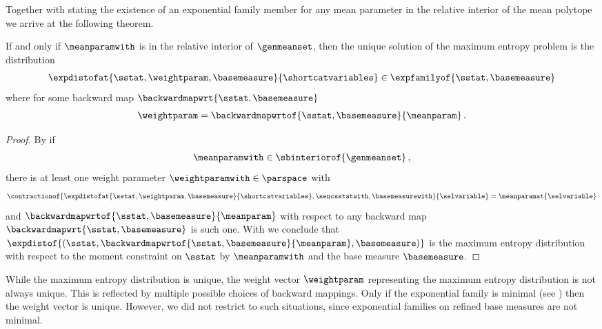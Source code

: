 Together with  stating the existence of an exponential family member for any mean parameter in the relative interior of the mean polytope we arrive at the following theorem.

\begin{theorem}
    \label{the:maxEntropyInterior}
    If and only if $\meanparamwith$ is in the relative interior of $\genmeanset$, then the unique solution of the maximum entropy problem is the distribution
    \begin{align*}
        \expdistofat{\sstat,\weightparam,\basemeasure}{\shortcatvariables}\in\expfamilyof{\sstat,\basemeasure}
    \end{align*}
    where for some backward map $\backwardmapwrt{\sstat,\basemeasure}$
    \begin{align*}
        \weightparam
        = \backwardmapwrtof{\sstat,\basemeasure}{\meanparam} \, .
    \end{align*}
\end{theorem}
\begin{proof}
    By  if
    \begin{align*}
        \meanparamwith \in \sbinteriorof{\genmeanset}  \, ,
    \end{align*}
    there is at least one weight parameter $\weightparamwith\in\parspace$ with
    \begin{align*}
        \contractionof{\expdistofat{\sstat,\weightparam,\basemeasure}{\shortcatvariables},\sencsstatwith,\basemeasurewith}{\selvariable}
        =\meanparamat{\selvariable}
    \end{align*}
    and $\backwardmapwrtof{\sstat,\basemeasure}{\meanparam}$ with respect to any backward map $\backwardmapwrt{\sstat,\basemeasure}$ is such one.
    With  we conclude that $\expdistof{(\sstat,\backwardmapwrtof{\sstat,\basemeasure}{\meanparam},\basemeasure)}$ is the maximum entropy distribution with respect to the moment constraint on $\sstat$ by $\meanparamwith$ and the base measure $\basemeasure$.
\end{proof}

While the maximum entropy distribution is unique, the weight vector $\weightparam$ representing the maximum entropy distribution is not always unique.
This is reflected by multiple possible choices of backward mappings.
Only if the exponential family is minimal (see \cite{wainwright_graphical_2008}) then the weight vector is unique.
However, we did not restrict to such situations, since exponential families on refined base measures are not minimal.